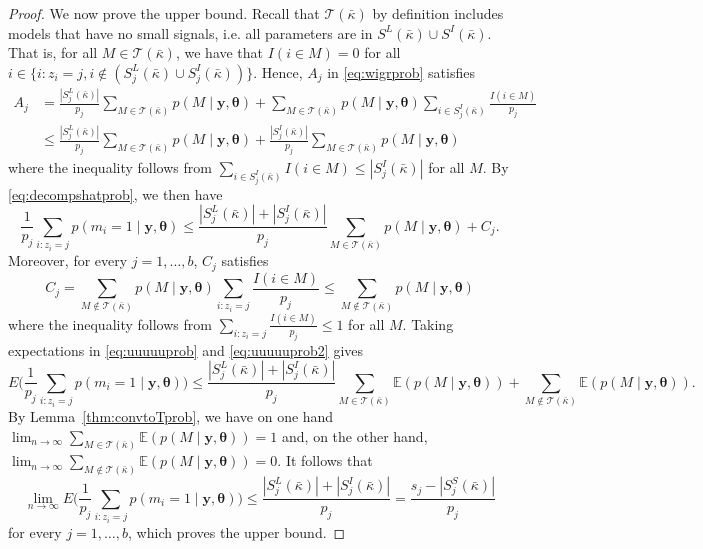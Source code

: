 \documentclass[
  12pt]{article}
\newcommand{\E}{\mathbb{E}}
\newcommand{\T}{\mathcal{T}}
\newcommand{\by}{\mathbf{y}}
\newcommand{\btheta}{\boldsymbol{\theta}}
\begin{document}
\begin{proof}
We now prove the upper bound. Recall that $\T(\bar{\kappa})$ by definition includes models that have no small signals, i.e. all parameters are in $S^L(\bar{\kappa}) \cup S^I(\bar{\kappa})$. That is,
for all $M\in\T(\bar{\kappa})$, we have that $I(i\in  M)=0$ for all $i \in\{i:z_i=j, i\not\in(S^{L}_j(\bar{\kappa})\cup S^{I}_j(\bar{\kappa}))\}$. Hence, $A_j$ in \eqref{eq:wigrprob} satisfies
\begin{align*}
    A_j
   &= \frac{|S^{L}_j(\bar{\kappa})|}{p_j}\sum_{M \in \T(\bar{\kappa})} p(M \mid \by, \btheta)+\sum_{M \in \T(\bar{\kappa})} p(M \mid \by, \btheta)\sum_{i \in S^{I}_j(\bar{\kappa})}\frac{I(i\in  M)}{p_j}\\
   &\leq\frac{|S^{L}_j(\bar{\kappa})|}{p_j}\sum_{M \in \T(\bar{\kappa})} p(M \mid \by, \btheta)+ \frac{|S^{I}_j(\bar{\kappa})|}{p_j}\sum_{M \in \T(\bar{\kappa})} p(M \mid \by, \btheta)
\end{align*}
where the inequality follows from $\sum_{i \in S^{I}_j(\bar{\kappa})} I(i\in  M) \leq |S_j^{I}(\bar{\kappa})|$  for all $M$. By \eqref{eq:decompshatprob}, we then have
\begin{equation}\label{eq:uuuuuprob}
    \frac{1}{p_j}\sum_{i:z_i=j} p(m_i=1 \mid \by, \btheta)\leq \frac{|S^{L}_j(\bar{\kappa})|+|S^{I}_j(\bar{\kappa})|}{p_j}\sum_{M \in \T(\bar{\kappa})} p(M \mid \by, \btheta) + C_j.
\end{equation}
Moreover, for every $j=1,\ldots,b$, $C_j$ satisfies
\begin{equation}\label{eq:uuuuuprob2}
    C_j = \sum_{M \not\in \T(\bar{\kappa})} p(M \mid \by, \btheta)\sum_{i:z_i=j}\frac{I(i\in  M)}{p_j}\leq \sum_{M \not\in \T(\bar{\kappa})} p(M \mid \by, \btheta)
\end{equation}
where the inequality follows from $\sum_{i:z_i=j}\frac{I(i\in  M)}{p_j}\leq 1$ for all $M$.
Taking expectations in \eqref{eq:uuuuuprob} and \eqref{eq:uuuuuprob2} gives
\begin{equation*}
    E\bigg(\frac{1}{p_j}\sum_{i:z_i=j} p(m_i=1 \mid \by, \btheta)\bigg) 
    \leq \frac{|S^{L}_j(\bar{\kappa})|+|S^{I}_j(\bar{\kappa})|}{p_j}\sum_{M \in \T(\bar{\kappa})}\E( p(M \mid \by, \btheta)) + \sum_{M \not\in \T(\bar{\kappa})}\E( p(M \mid \by, \btheta)).
\end{equation*}
 By Lemma~\ref{thm:convtoTprob}, we have on one hand $\lim_{n\to \infty}\sum_{M \in \T(\bar{\kappa})}\E( p(M \mid \by, \btheta))= 1$ and, on the other hand, $\lim_{n\to \infty}\sum_{M \not\in\T(\bar{\kappa})}\E( p(M \mid \by, \btheta))= 0$. It follows that $$ \lim_{n\to \infty}E\bigg(\frac{1}{p_j}\sum_{i:z_i=j} p(m_i=1 \mid \by, \btheta)\bigg) \leq  \frac{|S^{L}_j(\bar{\kappa})|+|S^{I}_j(\bar{\kappa})|}{p_j}= \frac{s_j-|S^{S}_j(\bar{\kappa})|}{p_j}$$ for every $j=1,\ldots,b$, which proves the upper bound.
\end{proof}
\end{document}
